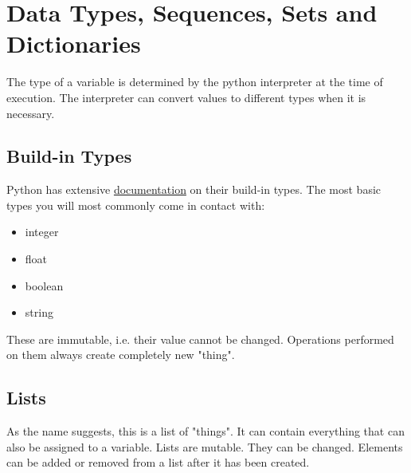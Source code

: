 \documentclass{article}
\begin{document}
\section{Data Types, Sequences, Sets and Dictionaries}

The type of a variable is determined by the python interpreter at the time
of execution.
The interpreter can convert values to different types when it is necessary. 

\subsection{Build-in Types}

Python has extensive \href{https://docs.python.org/3/library/stdtypes.html}{documentation}
on their build-in types. 
The most basic types you will most commonly come in contact with:

\begin{itemize}
    \item integer
    \item float
    \item boolean
    \item string
\end{itemize}

These are immutable, i.e. their value cannot be changed.
Operations performed on them always create completely new "thing".



\subsection{Lists}

As the name suggests, this is a list of "things".
It can contain everything that can also be assigned to a variable.
Lists are mutable. They can be changed.
Elements can be added or removed from a list after it has been created.
\end{document}
